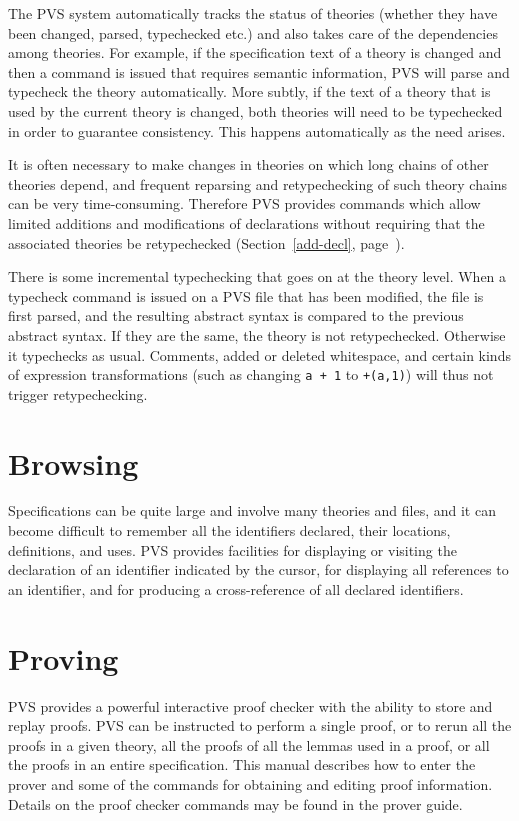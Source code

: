 The PVS system automatically tracks the status of theories (whether they
have been changed, parsed, typechecked etc.) and also takes care of the
dependencies among theories.  For example, if the specification text of a
theory is changed and then a command is issued that requires semantic
information, PVS will parse and typecheck the theory automatically.
More subtly, if the text of a theory that is used by the current theory is
changed, both theories will need to be typechecked in order to guarantee
consistency.  This happens automatically as the need arises.

It is often necessary to make changes in theories on which long chains of
other theories depend, and frequent reparsing and retypechecking of such
theory chains can be very time-consuming.  Therefore PVS provides commands
which allow limited additions and modifications of declarations without
requiring that the associated theories be retypechecked
(Section~\ref{add-decl}, page~\pageref{add-decl}).

There is some incremental typechecking that goes on at the theory level.
When a typecheck command is issued on a PVS file that has been modified,
the file is first parsed, and the resulting abstract syntax is compared to
the previous abstract syntax.  If they are the same, the theory is not
retypechecked.  Otherwise it typechecks as usual.  Comments, added or
deleted whitespace, and certain kinds of expression transformations (such
as changing \texttt{a + 1} to \texttt{+(a,1)}) will thus not trigger
retypechecking.

\section*{Browsing}

Specifications can be quite large and involve many theories and files,
and it can become difficult to remember all the identifiers declared,
their locations, definitions, and uses.  PVS provides facilities for
displaying or visiting the declaration of an identifier indicated by
the cursor, for displaying all references to an identifier, and for
producing a cross-reference of all declared identifiers.

\section*{Proving}

PVS provides a powerful interactive proof checker with the ability to
store and replay proofs.  PVS can be instructed to perform a single proof,
or to rerun all the proofs in a given theory, all the proofs of all the
lemmas used in a proof, or all the proofs in an entire specification.
This manual describes how to enter the prover and some of the commands for
obtaining and editing proof information.  Details on the proof checker
commands may be found in the prover guide.


